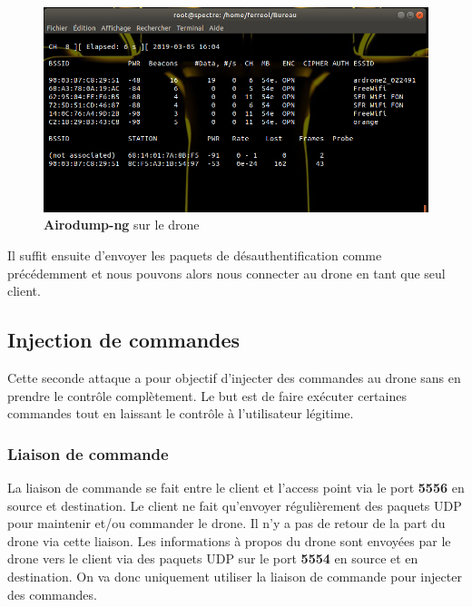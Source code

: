 \begin{figure}[H]
  \centering
  \includegraphics[scale=0.5]{images/airodump}
  \caption{\textbf{Airodump-ng} sur le drone}
\end{figure}

Il suffit ensuite d'envoyer les paquets de désauthentification comme précédemment et nous pouvons alors nous connecter au drone en tant que seul client.

\subsection{Injection de commandes}
Cette seconde attaque a pour objectif d'injecter des commandes au drone sans en prendre le contrôle complètement. Le but est de faire exécuter certaines commandes tout en laissant le contrôle à l'utilisateur légitime.

\subsubsection{Liaison de commande}
La liaison de commande se fait entre le client et l'access point via le port \textbf{5556} en source et destination. Le client ne fait qu'envoyer régulièrement des paquets UDP pour maintenir et/ou commander le drone. Il n'y a pas de retour de la part du drone via cette liaison. Les informations à propos du drone sont envoyées par le drone vers le client via des paquets UDP sur le port \textbf{5554} en source et en destination. On va donc uniquement utiliser la liaison de commande pour injecter des commandes.

